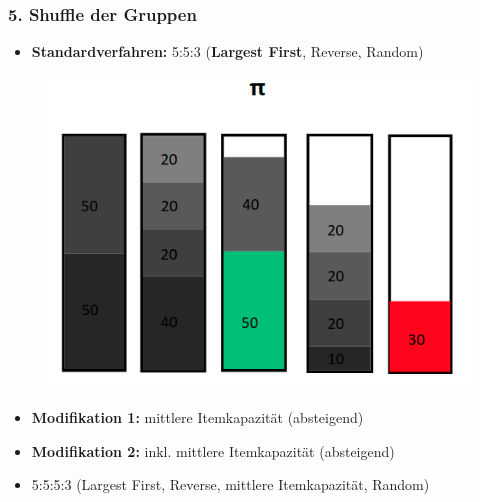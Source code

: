 \documentclass{beamer}
\begin{document}
\begin{frame}
\frametitle{5. Shuffle der Gruppen}
\begin{footnotesize}
\begin{itemize}
\item \textbf{Standardverfahren:} 5:5:3 (\textbf{Largest First}, Reverse, Random)
\end{itemize}
\end{footnotesize}
\begin{figure}[!htbp]
\begin{center}
\includegraphics[scale=0.25]{img/HC_5.png}
\end{center}
\end{figure}
\begin{footnotesize}
\begin{itemize}
\item \textbf{Modifikation 1:} mittlere Itemkapazität (absteigend)
\item \textbf{Modifikation 2:} inkl. mittlere Itemkapazität (absteigend)
\item[] 5:5:5:3 (Largest First, Reverse, mittlere Itemkapazität, Random) 
\end{itemize}
\end{footnotesize}

\end{frame}
\end{document}
